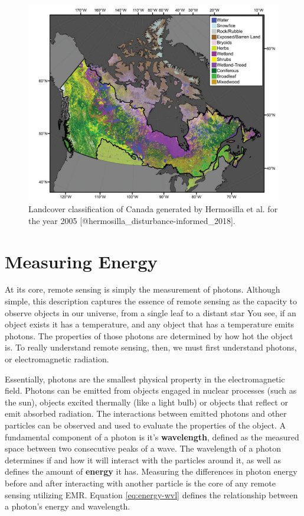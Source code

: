\documentclass[
]{book}
\begin{document}
\begin{figure}
\includegraphics[width=10.64in]{images/11-hermosilla-canada-landcover} \caption{Landcover classification of Canada generated by Hermosilla et al. for the year 2005 [@hermosilla_disturbance-informed_2018].}\label{fig:11-hermosilla-canada-landcover}
\end{figure}

\section{Measuring Energy}\label{measuring-energy}

At its core, remote sensing is simply the measurement of photons. Although simple, this description captures the essence of remote sensing as the capacity to observe objects in our universe, from a single leaf to a distant star You see, if an object exists it has a temperature, and any object that has a temperature emits photons. The properties of those photons are determined by how hot the object is. To really understand remote sensing, then, we must first understand photons, or electromagnetic radiation.

Essentially, photons are the smallest physical property in the electromagnetic field. Photons can be emitted from objects engaged in nuclear processes (such as the sun), objects excited thermally (like a light bulb) or objects that reflect or emit absorbed radiation. The interactions between emitted photons and other particles can be observed and used to evaluate the properties of the object. A fundamental component of a photon is it's \textbf{wavelength}, defined as the measured space between two consecutive peaks of a wave. The wavelength of a photon determines if and how it will interact with the particles around it, as well as defines the amount of \textbf{energy} it has. Measuring the differences in photon energy before and after interacting with another particle is the core of any remote sensing utilizing EMR. Equation \eqref{eq:energy-wvl} defines the relationship between a photon's energy and wavelength.
\end{document}
